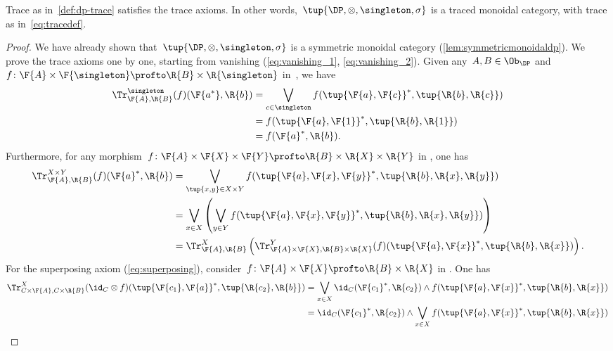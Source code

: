 \begin{lemma}
  Trace as in~\cref{def:dp-trace} satisfies the trace axioms. In other words,~$\tup{\DP, \otimes, \singleton, \sigma}$ is a traced monoidal category, with trace as in~\cref{eq:tracedef}.
\end{lemma}
\begin{proof}
  We have already shown that~$\tup{\DP,\otimes,\singleton,\sigma}$ is a symmetric monoidal category (\cref{lem:symmetricmonoidaldp}).
  We prove the trace axioms one by one, starting from vanishing (\cref{eq:vanishing_1}, \cref{eq:vanishing_2}). Given any~$A,B\in \Ob_\DP$ and~$f\colon \F{A}\times \F{\singleton}\profto \R{B}\times \R{\singleton}$ in~\DP, we have
  \begin{equation}
    \begin{aligned}
      \Tr_{\F{A},\R{B}}^{\singleton}(f)(\F{a^*},\R{b})&=\bigvee_{c\in \singleton}f(\tup{\F{a},\F{c}}^*,\tup{\R{b},\R{c}})\\
      &=f(\tup{\F{a},\F{1}}^*,\tup{\R{b},\R{1}})\\
      &=f(\F{a}^*,\R{b}).
    \end{aligned}
  \end{equation}
  Furthermore, for any morphism~$f\colon \F{A}\times \F{X}\times \F{Y} \profto \R{B}\times \R{X} \times \R{Y}$ in \DP, one has
  \begin{equation}
    \begin{aligned}
      \Tr_{\F{A},\R{B}}^{X\times Y}(f)(\F{a}^*,\R{b})&=\bigvee_{\tup{x,y} \in X\times Y} f(\tup{\F{a},\F{x},\F{y}}^*,\tup{\R{b},\R{x},\R{y}})\\
      &=\bigvee_{x \in X}\left(\bigvee_{y \in Y} f(\tup{\F{a},\F{x},\F{y}}^*,\tup{\R{b},\R{x},\R{y}})\right)\\
      &=\Tr_{\F{A},\R{B}}^X\left(
      \Tr_{\F{A}\times \F{X},\R{B}\times \R{X}}^Y(f)(\tup{\F{a},\F{x}}^*,\tup{\R{b},\R{x}})\right).
    \end{aligned}
  \end{equation}
  For the superposing axiom (\cref{eq:superposing}), consider~$f\colon \F{A}\times \F{X}\profto \R{B}\times \R{X}$ in \DP. One has
  \begin{equation}
    \begin{aligned}
      \Tr_{C\times \F{A},C\times \R{B}}^{X}(\id_C\otimes f)(\tup{\F{c_1},\F{a}}^*,\tup{\R{c_2},\R{b}})&=\bigvee_{x\in X} \id_C(\F{c_1}^*,\R{c_2})\wedge f(\tup{\F{a},\F{x}}^*,\tup{\R{b},\R{x}})\\
      &=\id_C(\F{c_1}^*,\R{c_2}) \wedge \bigvee_{x\in X} f(\tup{\F{a},\F{x}}^*,\tup{\R{b},\R{x}})\\

\end{aligned}
\end{equation}
\end{proof}
